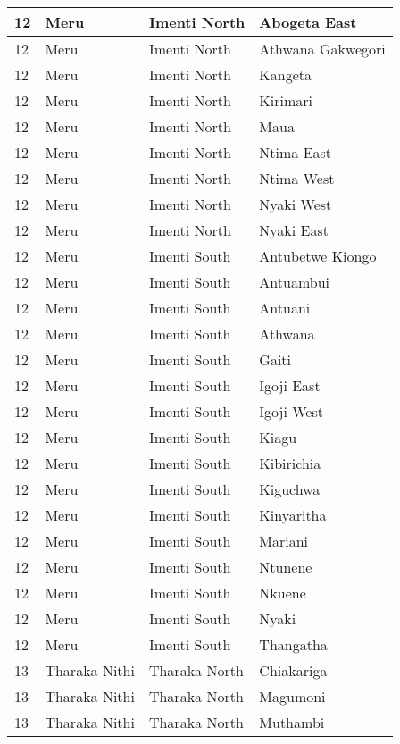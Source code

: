 \begin{table}[!ht]
\begin{tabular}{|l|l|l|l|}
        12 & Meru & Imenti North & Abogeta East \\ \hline
        12 & Meru & Imenti North & Athwana Gakwegori \\ \hline
        12 & Meru & Imenti North & Kangeta \\ \hline
        12 & Meru & Imenti North & Kirimari \\ \hline
        12 & Meru & Imenti North & Maua \\ \hline
        12 & Meru & Imenti North & Ntima East \\ \hline
        12 & Meru & Imenti North & Ntima West \\ \hline
        12 & Meru & Imenti North & Nyaki West \\ \hline
        12 & Meru & Imenti North & Nyaki East \\ \hline
        12 & Meru & Imenti South & Antubetwe Kiongo \\ \hline
        12 & Meru & Imenti South & Antuambui \\ \hline
        12 & Meru & Imenti South & Antuani \\ \hline
        12 & Meru & Imenti South & Athwana \\ \hline
        12 & Meru & Imenti South & Gaiti \\ \hline
        12 & Meru & Imenti South & Igoji East \\ \hline
        12 & Meru & Imenti South & Igoji West \\ \hline
        12 & Meru & Imenti South & Kiagu \\ \hline
        12 & Meru & Imenti South & Kibirichia \\ \hline
        12 & Meru & Imenti South & Kiguchwa \\ \hline
        12 & Meru & Imenti South & Kinyaritha \\ \hline
        12 & Meru & Imenti South & Mariani \\ \hline
        12 & Meru & Imenti South & Ntunene \\ \hline
        12 & Meru & Imenti South & Nkuene \\ \hline
        12 & Meru & Imenti South & Nyaki \\ \hline
        12 & Meru & Imenti South & Thangatha \\ \hline
        13 & Tharaka Nithi & Tharaka North & Chiakariga \\ \hline
        13 & Tharaka Nithi & Tharaka North & Magumoni \\ \hline
        13 & Tharaka Nithi & Tharaka North & Muthambi \\ \hline

\end{tabular}
\end{table}
